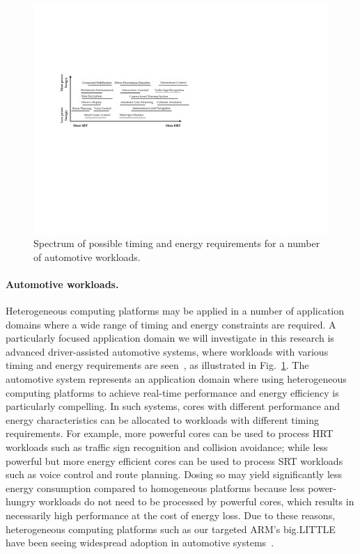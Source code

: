 \begin{figure}[h]
\centering 
\includegraphics[width=5in]{images/automotive.pdf}
\vspace{-2mm}\caption{Spectrum of possible timing and energy requirements for a number of automotive workloads.}
\vspace{-4mm}
\label{fig:automotive}
\end{figure}

\paragraph{Automotive workloads.} 
\label{sec:automotiveworkload}

Heterogeneous computing platforms may be applied in a number of application domains where a wide range of timing and energy constraints are required. A particularly focused application domain we will investigate in this research is advanced driver-assisted automotive systems, where workloads with various timing and energy requirements are seen~\cite{?}, as illustrated in Fig.~\ref{fig:automotive}.  
The automotive system represents an application domain where using heterogeneous computing platforms to achieve real-time performance and energy efficiency is particularly compelling. 
 In such systems, cores with different performance and energy characteristics can be allocated to workloads with different timing requirements. For example, more powerful cores can be used to process HRT workloads such as traffic sign recognition and collision avoidance; while less powerful but more energy efficient cores can be used to process SRT workloads such as voice control and route planning. Dosing so may yield significantly less energy consumption compared to homogeneous platforms because less power-hungry workloads do not need to be processed by powerful cores, which results in necessarily high performance at the cost of energy loss. 
Due to these reasons, heterogeneous computing platforms such as our targeted ARM's big.LITTLE have been seeing widespread adoption in automotive systems~\cite{?}. 


